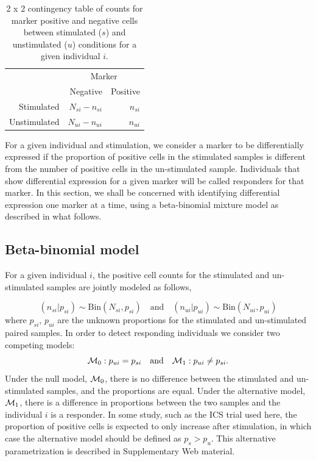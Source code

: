\documentclass[11pt]{article}
\begin{document}
\begin{table}[ht]
\centering
\parbox{0.8\linewidth}{
\caption{2 x 2 contingency table of counts for marker positive and negative cells between stimulated ($s$) and unstimulated ($u$) conditions for a given individual $i$.}\label{tab:twobytwo}
\centering
\begin{tabular}{rrr}

  \hline
\multicolumn{1}{l}{}&
\multicolumn{2}{c}{Marker}\\
 & Negative & Positive \\ 
  \hline
Stimulated &   $N_{si} - n_{si}$ &   $n_{si}$ \\ 
Unstimulated &   $N_{ui}-n_{ui}$ &   $n_{ui}$ \\ 
   \hline
\end{tabular}
}
\end{table}
For a given individual and stimulation, we consider a marker to be differentially expressed if the proportion of positive cells in the stimulated samples is different from the number of positive cells in the un-stimulated sample. Individuals that show differential expression for a given marker will be called responders for that marker. In this section, we shall be concerned with identifying differential expression one marker at a time, using a beta-binomial mixture model as described in what follows. 

\subsection{Beta-binomial model}
\label{sec:DE}
For a given individual $i$, the positive cell counts for the stimulated and un-stimulated samples are jointly modeled as follows,

\begin{equation}
(n_{si}|p_{si}) \sim \mathrm{Bin}(N_{si},p_{si})\quad \text{and}\quad (n_{ui}|p_{ui}) \sim \mathrm{Bin}(N_{ui},p_{ui})\label{eq:bino_likelihood}
\end{equation}
where $p_{si}$, $p_{ui}$ are the unknown proportions for the stimulated and un-stimulated paired samples. In order to detect responding individuals we consider two competing models:
\begin{equation}
{\cal M}_0: p_{ui}=p_{si}\quad \text{and}\quad {\cal M}_1: p_{ui}\ne p_{si}. \label{eq:beta_prior}
\end{equation}
Under the null model, ${\cal M}_0$, there is no difference between the stimulated and un-stimulated samples, and the proportions are equal. Under the alternative model, ${\cal M}_1$, there is a difference in proportions between the two samples and the individual $i$ is a responder. In some study, such as the ICS trial used here, the proportion of positive cells is expected to only increase after stimulation, in which case the alternative model should be defined as $p_s>p_u$. This alternative parametrization is described in Supplementary Web material.
\end{document}
